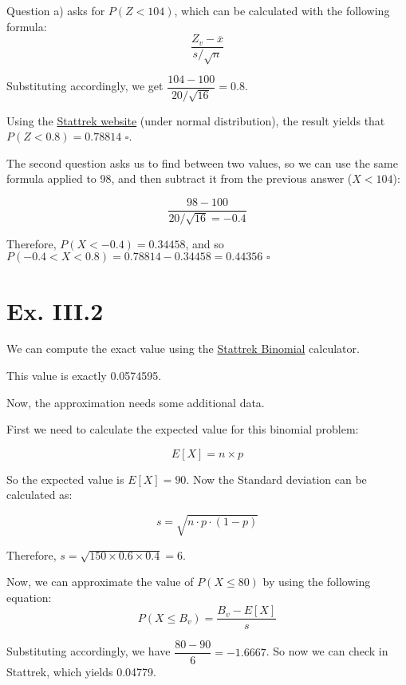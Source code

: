 \documentclass[titlepage, letterpaper]{article}
\newcommand{\qed}{\,\,\square}
\begin{document}
Question a) asks for $P(Z < 104)$, which can be calculated with the following formula:
\begin{equation}
    \frac{Z_v - \overline{x}}{s/\sqrt{n}}
\end{equation}

Substituting accordingly, we get $\dfrac{104 - 100}{20 / \sqrt{16}} = 0.8$.

Using the \href{http://stattrek.com/online-calculator/normal.aspx}{Stattrek website} (under normal distribution), the result yields that $P(Z < 0.8) = 0.78814 \qed$.

The second question asks us to find between two values, so we can use the same formula applied to 98, and then subtract it from the previous answer ($X < 104$):

$$\frac{98 - 100}{20/\sqrt{16} = -0.4}$$

Therefore, $P(X < -0.4) = 0.34458$, and so $P(-0.4 < X < 0.8) = 0.78814 - 0.34458 = 0.44356 \qed$

\section{Ex. III.2} %
\label{sec:ex_iii_2}
We can compute the exact value using the \href{http://stattrek.com/online-calculator/binomial.aspx}{Stattrek Binomial} calculator.

This value is exactly 0.0574595.

Now, the approximation needs some additional data.

First we need to calculate the expected value for this binomial problem:

\begin{equation}
E[X] = n \times p    
\end{equation}

So the expected value is $E[X] = 90$.
Now the Standard deviation can be calculated as:

\begin{equation}
    s = \sqrt{n \cdot p \cdot (1-p)}
\end{equation}

Therefore, $s = \sqrt{150 \times 0.6 \times 0.4} = 6$.

Now, we can approximate the value of $P(X \leq 80)$ by using the following equation:
\begin{equation}
    P(X\leq B_v) = \dfrac{B_v - E[X]}{s}
\end{equation}

Substituting accordingly, we have $\dfrac{80 - 90}{6} = -1.6667$. So now we can check in Stattrek, which yields 0.04779.
\end{document}

